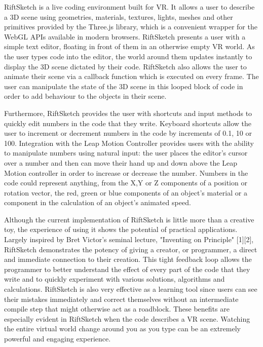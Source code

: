 \documentclass{acm_proc_article-sp}
\begin{document}
RiftSketch is a live coding environment built for VR. It allows a user to describe a 3D scene using geometries, materials, textures, lights, meshes and other primitives provided by the Three.js library, which is a convenient wrapper for the WebGL APIs available in modern browsers. RiftSketch presents a user with a simple text editor, floating in front of them in an otherwise empty VR world. As the user types code into the editor, the world around them updates instantly to display the 3D scene dictated by their code. RiftSketch also allows the user to animate their scene via a callback function which is executed on every frame. The user can manipulate the state of the 3D scene in this looped block of code in order to add behaviour to the objects in their scene.

Furthermore, RiftSketch provides the user with shortcuts and input methods to quickly edit numbers in the code that they write. Keyboard shortcuts allow the user to increment or decrement numbers in the code by increments of 0.1, 10 or 100. Integration with the Leap Motion Controller provides users with the ability to manipulate numbers using natural input: the user places the editor's cursor over a number and then can move their hand up and down above the Leap Motion controller in order to increase or decrease the number. Numbers in the code could represent anything, from the X,Y or Z components of a position or rotation vector, the red, green or blue components of an object's material or a component in the calculation of an object's animated speed.

Although the current implementation of RiftSketch is little more than a creative toy, the experience of using it shows the potential of practical applications. Largely inspired by Bret Victor's seminal lecture, "Inventing on Principle" [1][2], RiftSketch demonstrates the potency of giving a creator, or programmer, a direct and immediate connection to their creation. This tight feedback loop allows the programmer to better understand the effect of every part of the code that they write and to quickly experiment with various solutions, algorithms and calculations. RiftSketch is also very effective as a learning tool since users can see their mistakes immediately and correct themselves without an intermediate compile step that might otherwise act as a roadblock.  These benefits are especially evident in RiftSketch when the code describes a VR scene. Watching the entire virtual world change around you as you type can be an extremely powerful and engaging experience.
\end{document}
